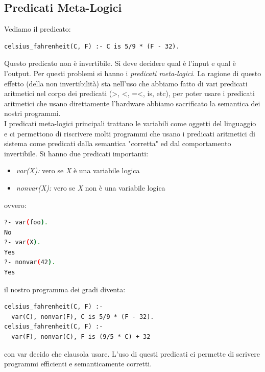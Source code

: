 \documentclass[a4paper,12pt, oneside]{book}
\begin{document}
\subsection{Predicati Meta-Logici}
Vediamo il predicato:
\begin{verbatim}
celsius_fahrenheit(C, F) :- C is 5/9 * (F - 32).
\end{verbatim}
Questo predicato non è invertibile. Si deve decidere qual è l'input e qual è l'output. Per questi problemi si hanno i \textit{predicati meta-logici}. La ragione di questo effetto (della non invertibilità) sta nell'uso che abbiamo fatto di vari predicati aritmetici nel corpo dei predicati (>, <, =<, is, etc), per poter usare i predicati aritmetici che usano direttamente l'hardware abbiamo sacrificato la semantica dei
nostri programmi.\\
I predicati meta-logici principali trattano le variabili come oggetti del linguaggio e ci permettono di riscrivere molti programmi che usano i predicati aritmetici di sistema come predicati dalla semantica "corretta" ed dal comportamento invertibile. Si hanno due predicati importanti:
\begin{itemize}
\item \textit{var(X):}  vero se \textit{X} è una variabile logica
\item \textit{nonvar(X):}  vero se \textit{X} non è una variabile logica
\end{itemize}
ovvero:

\begin{shaded}
\begin{lstlisting}[language=bash]
?- var(foo).
No
?- var(X).
Yes
?- nonvar(42).
Yes
\end{lstlisting}
\end{shaded}

il nostro programma dei gradi diventa:
\begin{verbatim}
celsius_fahrenheit(C, F) :- 
  var(C), nonvar(F), C is 5/9 * (F - 32).
celsius_fahrenheit(C, F) :- 
  var(F), nonvar(C), F is (9/5 * C) + 32
\end{verbatim}
con var decido che clausola usare. L'uso di questi predicati ci permette di scrivere programmi efficienti e semanticamente corretti.
\end{document}
